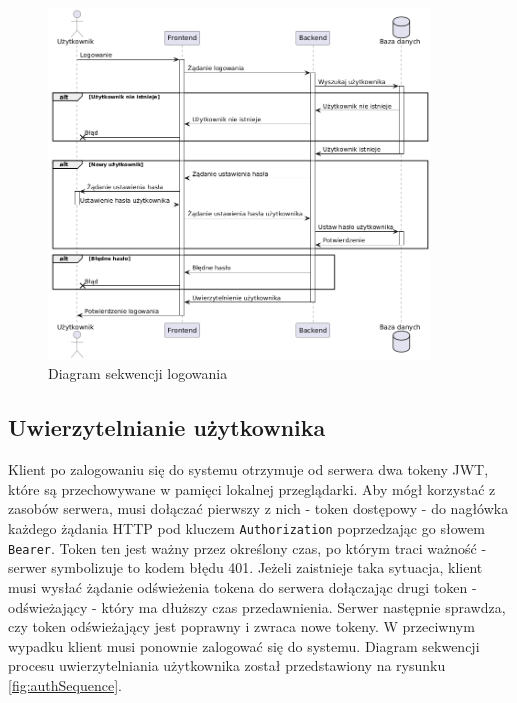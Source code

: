 \begin{figure}[H]
    \centering
    \includegraphics[width=0.9\textwidth]{graf/loginSequence.png}
    \caption{Diagram sekwencji logowania}
    \label{fig:login}
\end{figure}

\subsection{Uwierzytelnianie użytkownika}

Klient po zalogowaniu się do systemu otrzymuje od serwera dwa tokeny JWT, które są przechowywane w pamięci lokalnej przeglądarki. Aby mógł korzystać z zasobów serwera, musi dołączać pierwszy z nich - token dostępowy - do nagłówka każdego żądania HTTP pod kluczem \texttt{Authorization} poprzedzając go słowem \texttt{Bearer}. Token ten jest ważny przez określony czas, po którym traci ważność - serwer symbolizuje to kodem błędu 401. Jeżeli zaistnieje taka sytuacja, klient musi wysłać żądanie odświeżenia tokena do serwera dołączając drugi token - odświeżający - który ma dłuższy czas przedawnienia. Serwer następnie sprawdza, czy token odświeżający jest poprawny i zwraca nowe tokeny. W przeciwnym wypadku klient musi ponownie zalogować się do systemu. Diagram sekwencji procesu uwierzytelniania użytkownika został przedstawiony na rysunku \ref{fig:authSequence}.

